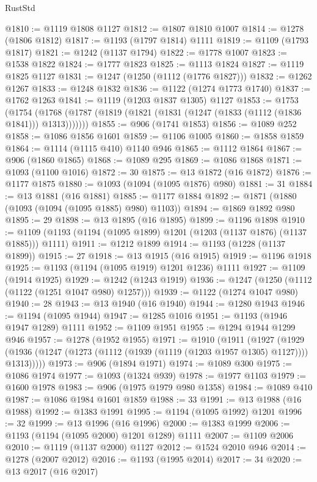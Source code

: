 \begin{lexlean}{RustStd}
\begin{coremodule}
@1810 := @1119 @1808 @1127
@1812 := @1807 @1810 @1007
@1814 := @1278 (@1806 @1812)
@1817 := @1193 (@1797 @1814) @1111
@1819 := @1109 (@1793 @1817)
@1821 := @1242 (@1137 @1794)
@1822 := @1778 @1007
@1823 := @1538 @1822
@1824 := @1777 @1823
@1825 := @1113 @1824
@1827 := @1119 @1825 @1127
@1831 := @1247 (@1250 (@1112 (@1776 @1827)))
@1832 := @1262 @1267
@1833 := @1248 @1832
@1836 := @1122 (@1274 @1773 @1740)
@1837 := @1762 @1263
@1841 := @1119 (@1203 @1837 @1305) @1127
@1853 := @1753
    (@1754 (@1768 (@1787 (@1819 (@1821 (@1831 (@1247 (@1833 (@1112 (@1836 @1841))) @1313)))))))
@1855 := @906 (@1741 @1853)
@1856 := @1089 @252
@1858 := @1086 @1856 @1601
@1859 := @1106 @1005
@1860 := @1858 @1859
@1864 := @1114 (@1115 @410) @1140 @946
@1865 := @1112 @1864
@1867 := @906 (@1860 @1865)
@1868 := @1089 @295
@1869 := @1086 @1868
@1871 := @1093 (@1100 @1016)
@1872 := 30
@1875 := @13 @1872 (@16 @1872)
@1876 := @1177 @1875
@1880 := @1093 (@1094 (@1095 @1876) @980)
@1881 := 31
@1884 := @13 @1881 (@16 @1881)
@1885 := @1177 @1884
@1892 := @1871 (@1880 (@1093 (@1094 (@1095 @1885) @980) @1103))
@1894 := @1869 @1892 @980
@1895 := 29
@1898 := @13 @1895 (@16 @1895)
@1899 := @1196 @1898
@1910 := @1109 (@1193 (@1194 (@1095 @1899) @1201 (@1203 (@1137 @1876) (@1137 @1885))) @1111)
@1911 := @1212 @1899
@1914 := @1193 (@1228 (@1137 @1899))
@1915 := 27
@1918 := @13 @1915 (@16 @1915)
@1919 := @1196 @1918
@1925 := @1193 (@1194 (@1095 @1919) @1201 @1236) @1111
@1927 := @1109 (@1914 @1925)
@1929 := @1242 (@1243 @1919)
@1936 := @1247 (@1250 (@1112 (@1122 (@1251 @1047 @980) @1257)))
@1939 := @1122 (@1274 @1047 @980)
@1940 := 28
@1943 := @13 @1940 (@16 @1940)
@1944 := @1280 @1943
@1946 := @1194 (@1095 @1944)
@1947 := @1285 @1016
@1951 := @1193 (@1946 @1947 @1289) @1111
@1952 := @1109 @1951
@1955 := @1294 @1944 @1299 @946
@1957 := @1278 (@1952 @1955)
@1971 := @1910
    (@1911
      (@1927
        (@1929 (@1936 (@1247 (@1273 (@1112 (@1939 (@1119 (@1203 @1957 @1305) @1127)))) @1313)))))
@1973 := @906 (@1894 @1971)
@1974 := @1089 @300
@1975 := @1086 @1974
@1977 := @1093 (@1324 @939)
@1978 := @1977 @1103
@1979 := @1600 @1978
@1983 := @906 (@1975 @1979 @980 @1358)
@1984 := @1089 @410
@1987 := @1086 @1984 @1601 @1859
@1988 := 33
@1991 := @13 @1988 (@16 @1988)
@1992 := @1383 @1991
@1995 := @1194 (@1095 @1992) @1201
@1996 := 32
@1999 := @13 @1996 (@16 @1996)
@2000 := @1383 @1999
@2006 := @1193 (@1194 (@1095 @2000) @1201 @1289) @1111
@2007 := @1109 @2006
@2010 := @1119 (@1137 @2000) @1127
@2012 := @1524 @2010 @946
@2014 := @1278 (@2007 @2012)
@2016 := @1193 (@1995 @2014)
@2017 := 34
@2020 := @13 @2017 (@16 @2017)

\end{coremodule}
\end{lexlean}

